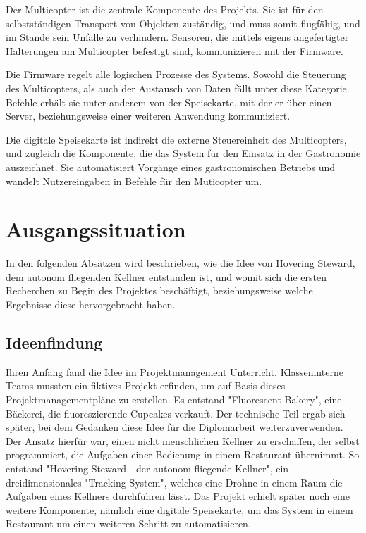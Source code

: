 Der Multicopter ist die zentrale Komponente des Projekts. Sie ist für den selbstständigen Transport von Objekten zuständig,
und muss somit flugfähig, und im Stande sein Unfälle zu verhindern. Sensoren, die mittels eigens angefertigter Halterungen
am Multicopter befestigt sind, kommunizieren mit der Firmware.

Die Firmware regelt alle logischen Prozesse des Systems. Sowohl die Steuerung des Multicopters, als auch der
Austausch von Daten fällt unter diese Kategorie. Befehle erhält sie unter anderem von der Speisekarte, mit der er über
einen Server, beziehungsweise einer weiteren Anwendung kommuniziert.

Die digitale Speisekarte ist indirekt die externe Steuereinheit des Multicopters, und zugleich die Komponente,
die das System für den Einsatz in der Gastronomie auszeichnet. Sie automatisiert Vorgänge eines gastronomischen
Betriebs und wandelt Nutzereingaben in Befehle für den Muticopter um.

\section{Ausgangssituation}
  In den folgenden Absätzen wird beschrieben, wie die Idee von Hovering Steward, dem autonom fliegenden Kellner
  entstanden ist, und womit sich die ersten Recherchen zu Begin des Projektes beschäftigt, beziehungsweise
  welche Ergebnisse diese hervorgebracht haben.

  \subsection{Ideenfindung}
  Ihren Anfang fand die Idee im Projektmanagement Unterricht. Klasseninterne Teams mussten ein fiktives Projekt erfinden, um auf Basis dieses
  Projektmanagementpläne zu erstellen. Es entstand "Fluorescent Bakery", eine Bäckerei, die fluoreszierende Cupcakes verkauft.
  Der technische Teil ergab sich später, bei dem Gedanken diese Idee für die Diplomarbeit weiterzuverwenden. Der Ansatz hierfür war,
  einen nicht menschlichen Kellner zu erschaffen, der selbst programmiert, die Aufgaben einer Bedienung in einem Restaurant übernimmt.
  So entstand "Hovering Steward - der autonom fliegende Kellner", ein dreidimensionales "Tracking-System", welches eine Drohne in einem Raum die Aufgaben eines Kellners durchführen lässt.
  Das Projekt erhielt später noch eine weitere Komponente, nämlich eine digitale Speisekarte, um das System in einem Restaurant um einen weiteren Schritt zu automatisieren.

